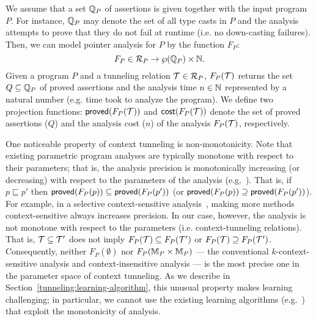 We assume that a set $\mathbb{Q}_P$ of assertions is given together
with the input program $P$.  For instance, $\mathbb{Q}_P$ may denote the set of all type casts in
$P$ and the analysis attempts to prove that they do not fail at
runtime (i.e. no down-casting failures).  Then,
we can model pointer analysis for $P$ by the function $F_P$:
\[
  F_P \in \mathcal{R}_P \to \wp(\mathbb{Q}_P) \times \mathbb{N}.
\]
Given a program $P$ and a tunneling relation
$\mathcal{T} \in \mathcal{R}_P$, $F_P(\mathcal{T})$ returns
the set $Q \subseteq \mathbb{Q}_P$ of proved assertions and the
analysis time $n \in \mathbb{N}$ represented by a natural number (e.g. time
took to analyze the program).  We define two projection functions:
${\sf proved}(F_P(\mathcal{T}))$ and
${\sf cost}(F_P(\mathcal{T}))$ denote the set of proved assertions
($Q$) and the analysis cost ($n$) of the analysis
$F_P(\mathcal{T})$, respectively.



One noticeable property of context tunneling is non-monotonicity.  Note
that existing parametric program analyses are typically monotone with respect to
their parameters; that is, the analysis precision is monotonically
increasing (or decreasing) with respect to the parameters of the
analysis
(e.g.~\cite{Liang2011learning,JeJeChOh17,Zhang2014,Liang2011}).  That
is, if $p \sqsubseteq p'$ then
${\sf proved}(F_P(p)) \subseteq {\sf proved}(F_P(p'))$ (or
${\sf proved}(F_P(p)) \supseteq {\sf proved}(F_P(p'))$). For example, in a
selective context-sensitive analysis~\cite{JeJeChOh17}, making more
methods context-sensitive always increases precision.  In our case,
however, the analysis is not monotone with respect to the parameters
(i.e. context-tunneling relations). That is,
$\mathcal{T} \subseteq \mathcal{T}'$ does not imply
$F_P(\mathcal{T}) \subseteq F_P(\mathcal{T}')$ or
$F_P(\mathcal{T}) \supseteq F_P(\mathcal{T}')$.  Consequently, neither $F_P(\emptyset)$ nor
$F_P({\mathbb{M}}_P\times{\mathbb{M}}_P)$ --- the conventional
$k$-context-sensitive analysis and context-insensitive analysis --- is
the most precise one in the parameter space of context tunneling.
As we describe in
Section~\ref{tunneling:learning-algorithm}, this unusual property makes
learning challenging; in particular, we cannot use the existing
learning algorithms (e.g.~\cite{JeJeChOh17,Liang2011learning}) that
exploit the monotonicity of analysis.


